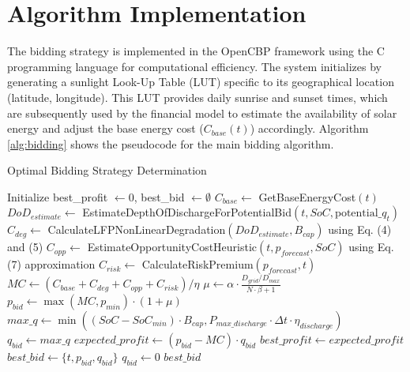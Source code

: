 \documentclass[11pt,a4paper]{article}
\begin{document}
\section{Algorithm Implementation} \label{sec:AlgorithmImplementation}
The bidding strategy is implemented in the OpenCBP framework using the C programming language for computational efficiency. The system initializes by generating a sunlight Look-Up Table (LUT) specific to its geographical location (latitude, longitude). This LUT provides daily sunrise and sunset times, which are subsequently used by the financial model to estimate the availability of solar energy and adjust the base energy cost ($C_{base}(t)$) accordingly. Algorithm \ref{alg:bidding} shows the pseudocode for the main bidding algorithm.

\begin{algorithm}
\caption{Optimal Bidding Strategy Determination}
\label{alg:bidding}
\begin{algorithmic}[1]
\State Initialize best\_profit $\gets 0$, best\_bid $\gets \emptyset$
    \State $C_{base} \gets$ GetBaseEnergyCost$(t)$ 
    \State $DoD_{estimate} \gets$ EstimateDepthOfDischargeForPotentialBid$(t, SoC, \text{potential\_}q_t)$
    \State $C_{deg} \gets$ CalculateLFPNonLinearDegradation$(DoD_{estimate}, B_{cap})$ using Eq. (4) and (5)
    \State $C_{opp} \gets$ EstimateOpportunityCostHeuristic$(t, p_{forecast}, SoC)$ using Eq. (7) approximation
    \State $C_{risk} \gets$ CalculateRiskPremium$(p_{forecast}, t)$
    \State $MC \gets (C_{base} + C_{deg} + C_{opp} + C_{risk}) / \eta$ 
    \State $\mu \gets \alpha \cdot \frac{D_{grid}/D_{max}}{N \cdot \beta + 1}$ 
    \State $p_{bid} \gets \max(MC, p_{min}) \cdot (1 + \mu)$ 
    \State $max\_q \gets \min((SoC - SoC_{min}) \cdot B_{cap}, P_{max\_discharge} \cdot \Delta t \cdot \eta_{discharge})$ 
        \State $q_{bid} \gets max\_q$ 
        \State $expected\_profit \gets (p_{bid} - MC) \cdot q_{bid}$
            \State $best\_profit \gets expected\_profit$
            \State $best\_bid \gets \{t, p_{bid}, q_{bid}\}$
        \EndIf
    \Else
        \State $q_{bid} \gets 0$ 
    \EndIf
\EndFor
\State \Return $best\_bid$
\EndProcedure
\end{algorithmic}
\end{algorithm}
\end{document}
